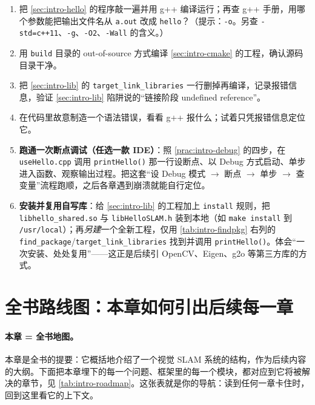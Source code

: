 \begin{practice}
\begin{enumerate}
  \item 把 \cref{sec:intro-hello} 的程序敲一遍并用 g++ 编译运行；再查 g++ 手册，用哪个参数能把输出文件名从 \texttt{a.out} 改成 \texttt{hello}？（提示：\texttt{-o}。另查 \texttt{-std=c++11}、\texttt{-g}、\texttt{-O2}、\texttt{-Wall} 的含义。）
  \item 用 \texttt{build} 目录的 out-of-source 方式编译 \cref{sec:intro-cmake} 的工程，确认源码目录干净。
  \item 把 \cref{sec:intro-lib} 的 \texttt{target\_link\_libraries} 一行删掉再编译，记录报错信息，验证 \cref{sec:intro-lib} 陷阱说的“链接阶段 undefined reference”。
  \item 在代码里故意制造一个语法错误，看看 g++ 报什么；试着只凭报错信息定位它。
  \item \textbf{跑通一次断点调试（任选一款 IDE）}：照 \cref{prac:intro-debug} 的四步，在 \texttt{useHello.\allowbreak cpp} 调用 \texttt{printHello()} 那一行设断点、以 Debug 方式启动、单步进入函数、观察输出过程。把这套“设 Debug 模式 $\to$ 断点 $\to$ 单步 $\to$ 查变量”流程跑顺，之后各章遇到崩溃就能自行定位。
  \item \textbf{安装并复用自写库}：给 \cref{sec:intro-lib} 的工程加上 \texttt{install} 规则，把 \texttt{libhello\_shared.\allowbreak so} 与 \texttt{libHelloSLAM.\allowbreak h} 装到本地（如 \texttt{make install} 到 \texttt{/usr/local}）；再\emph{另建}一个全新工程，仅用 \cref{tab:intro-findpkg} 右列的 \texttt{find\_package}/\allowbreak\texttt{target\_link\_libraries} 找到并调用 \texttt{printHello()}。体会“一次安装、处处复用”——这正是后续引 OpenCV、Eigen、g2o 等第三方库的方式\cite{gaoxiang2019slam14}。
\end{enumerate}
\end{practice}

\section{全书路线图：本章如何引出后续每一章}
\label{sec:intro-roadmap}

\paragraph{本章 = 全书地图。}
本章是全书的提要：它概括地介绍了一个视觉 SLAM 系统的结构，作为后续内容的大纲\cite{gaoxiang2019slam14}。下面把本章埋下的每一个问题、框架里的每一个模块，都对应到它将被解决的章节，见 \cref{tab:intro-roadmap}。这张表就是你的导航：读到任何一章卡住时，回到这里看它的上下文。

